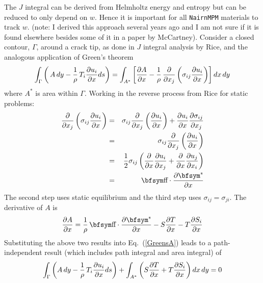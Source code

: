 \documentclass[11pt]{article}
\begin{document}
The $J$ integral can be derived from Helmholtz energy and entropy but can be reduced to only depend on $w$. Hence it is important for all {\tt NairnMPM} materials to track $w$. (note: I derived this approach several years ago and I am not sure if it is found elsewhere besides some of it in a paper by McCartney). Consider a closed contour, $\Gamma$, around a crack tip, as done in  $J$ integral analysis by Rice, and the analogous application of Green's theorem
\begin{equation}%
     \int_\Gamma \left(\thinspace A\thinspace dy
                           - {1\over\rho}\thinspace T_i {\partial u_i\over \partial x} ds\right)
     = \int_{A^*} \left[  {\partial A\over \partial x} -{1\over\rho}\thinspace
                 {\partial\over \partial x_j} \left(\sigma_{ij} {\partial u_i\over\partial x}\right)\right]dx\thinspace dy
                   \label{GreensA}
\end{equation}%
where $A^*$ is area within $\Gamma$. Working in the reverse process from Rice for static problems:
\begin{eqnarray}%
       {\partial\over\partial x_j}\left( \sigma_{ij}{\partial u_i\over\partial x}\right)
                 & = &    \sigma_{ij}  {\partial\over\partial x_j}\left({\partial u_i\over\partial x}\right)
                     +  {\partial u_i\over\partial x}{\partial\sigma_{ij}\over\partial x_j}   \\
                 & = & \sigma_{ij}  {\partial\over\partial x_j}\left({\partial u_i\over\partial x}\right) \\
                 & = & {1\over 2} \sigma_{ij}
                       \left({\partial\over\partial x}{\partial u_i\over\partial x_j}
                          + {\partial\over\partial x}{\partial u_j\over\partial x_i}\right) \\
                  & = & \st \cdot {\partial\et\over\partial x}
\end{eqnarray}%
The second step uses static equilibrium and the third step uses $\sigma_{ij}=\sigma_{ji}$. The derivative of $A$ is
\begin{equation}%
    {\partial A\over\partial x}  = {1\over \rho}\thinspace \st\cdot {\partial\et\over\partial x}
                - S {\partial T\over\partial x} - T  {\partial S_i\over\partial x}
\end{equation}%
Substituting the above two results into Eq.~(\ref{GreensA}) leads to a path-independent result (which includes path integral and area integral) of
\begin{equation}%
           \int_\Gamma \left(A\thinspace dy - {1\over\rho}\thinspace T_i {\partial u_i\over \partial x} ds\right)
                        + \int_{A^*}  \left( S {\partial T\over\partial x} + T {\partial S_i\over\partial x} 
                            \right ) dx \thinspace dy = 0
\end{equation}%
\end{document}
